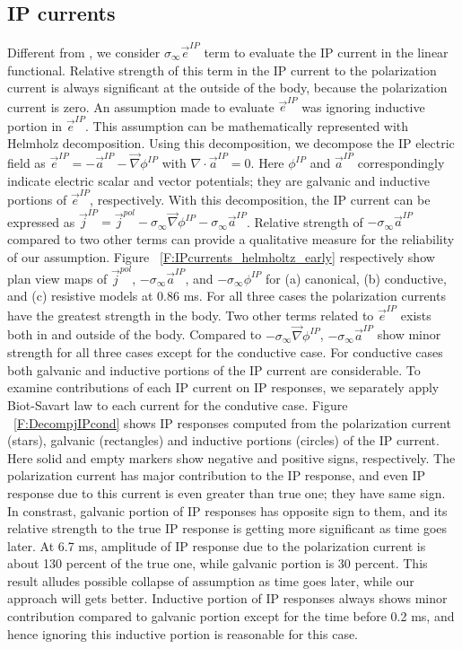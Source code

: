 \documentclass[extra,mreferee]{gji}
\renewcommand{\div}{\nabla\cdot}
\newcommand{\grad}{\vec \nabla}
\newcommand{\siginf}{\sigma_\infty}
\renewcommand {\j}  { {\vec j} }
\newcommand {\e}  { {\vec e} }
\begin{document}
\subsection{IP currents}
Different from \cite{Smith1988a}, we consider $\siginf \e^{IP}$ term to evaluate the IP current in the linear functional. Relative strength of this term in the IP current to the polarization current is always significant at the outside of the body, because the polarization current is zero. 
An assumption made to evaluate $\e^{IP}$ was ignoring inductive portion in $\e^{IP}$. 
This assumption can be mathematically represented with Helmholz decomposition. 
Using this decomposition, we decompose the IP electric field as $\e^{IP} = - \vec{a}^{IP} -\grad \phi^{IP}$ with $\div \vec{a}^{IP} = 0$. Here $\phi^{IP}$ and $\vec{a}^{IP}$ correspondingly indicate electric scalar and vector potentials; they are galvanic and inductive portions of $\e^{IP}$, respectively. With this decomposition, the IP current can be expressed as $\j^{IP} = \j^{pol}-\siginf \grad \phi^{IP}-\siginf \vec{a}^{IP}$. Relative strength of $-\siginf \vec{a}^{IP}$ compared to two other terms can provide a qualitative measure for the reliability of our assumption. 
Figure ~\ref{F:IPcurrents_helmholtz_early} respectively show plan view maps of $\j^{pol}$, $-\siginf \vec{a}^{IP}$, and $-\siginf \phi^{IP}$ for (a) canonical, (b) conductive, and (c) resistive models at 0.86 ms.
For all three cases the polarization currents have the greatest strength in the body. 
Two other terms related to $\e^{IP}$ exists both in and outside of the body. 
Compared to $-\siginf \grad\phi^{IP}$, $-\siginf \vec{a}^{IP}$ show minor strength for all three cases except for the conductive case. 
For conductive cases both galvanic and inductive portions of the IP current are considerable. 
To examine contributions of each IP current on IP responses, we separately apply Biot-Savart law to each current for the condutive case. 
Figure ~\ref{F:DecompjIPcond} shows IP responses computed from the polarization current (stars), galvanic (rectangles) and inductive portions (circles) of the IP current. Here solid and empty markers show negative and positive signs, respectively. 
The polarization current has major contribution to the IP response, and even IP response due to this current is even greater than true one; they have same sign.
In constrast, galvanic portion of IP responses has opposite sign to them, and its relative strength to the true IP response is getting more significant as time goes later. 
At 6.7 ms, amplitude of IP response due to the polarization current is about 130 percent of the true one, while galvanic portion is 30 percent. 
This result alludes possible collapse of \cite{Smith1988a} assumption as time goes later, while our approach will gets better. 
Inductive portion of IP responses always shows minor contribution compared to galvanic portion except for the time before 0.2 ms, and hence ignoring this inductive portion is reasonable for this case. 
\end{document}
